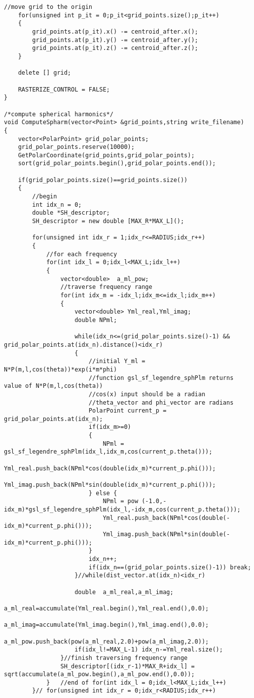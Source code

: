 \begin{enumerate}[1.]
\begin{lstlisting}[xleftmargin=0em]
	//move grid to the origin
	for(unsigned int p_it = 0;p_it<grid_points.size();p_it++)
	{
		grid_points.at(p_it).x() -= centroid_after.x();
		grid_points.at(p_it).y() -= centroid_after.y();
		grid_points.at(p_it).z() -= centroid_after.z();
	}

	delete [] grid;

	RASTERIZE_CONTROL = FALSE;
}

/*compute spherical harmonics*/
void ComputeSpharm(vector<Point> &grid_points,string write_filename)
{
	vector<PolarPoint> grid_polar_points;
	grid_polar_points.reserve(10000);
	GetPolarCoordinate(grid_points,grid_polar_points);
	sort(grid_polar_points.begin(),grid_polar_points.end());

	if(grid_polar_points.size()==grid_points.size())
	{
		//begin
		int idx_n = 0;
		double *SH_descriptor;
		SH_descriptor = new double [MAX_R*MAX_L]();

		for(unsigned int idx_r = 1;idx_r<=RADIUS;idx_r++)
		{
			//for each frequency
			for(int idx_l = 0;idx_l<MAX_L;idx_l++)
			{
				vector<double> 	a_ml_pow;
				//traverse frequency range
				for(int idx_m = -idx_l;idx_m<=idx_l;idx_m++)
				{
					vector<double> Yml_real,Yml_imag;
					double NPml;

					while(idx_n<=(grid_polar_points.size()-1) && grid_polar_points.at(idx_n).distance()<idx_r)
					{
						//initial Y_ml = N*P(m,l,cos(theta))*exp(i*m*phi)
						//function gsl_sf_legendre_sphPlm returns value of N*P(m,l,cos(theta))
						//cos(x) input should be a radian
						//theta_vector and phi_vector are radians
						PolarPoint current_p = grid_polar_points.at(idx_n);
						if(idx_m>=0)
						{
							NPml = gsl_sf_legendre_sphPlm(idx_l,idx_m,cos(current_p.theta()));
							Yml_real.push_back(NPml*cos(double(idx_m)*current_p.phi()));
							Yml_imag.push_back(NPml*sin(double(idx_m)*current_p.phi()));
						} else {
							NPml = pow (-1.0,-idx_m)*gsl_sf_legendre_sphPlm(idx_l,-idx_m,cos(current_p.theta()));
							Yml_real.push_back(NPml*cos(double(-idx_m)*current_p.phi()));
							Yml_imag.push_back(NPml*sin(double(-idx_m)*current_p.phi()));
						}
						idx_n++;
						if(idx_n==(grid_polar_points.size()-1)) break;
					}//while(dist_vector.at(idx_n)<idx_r)

					double 	a_ml_real,a_ml_imag;
					a_ml_real=accumulate(Yml_real.begin(),Yml_real.end(),0.0);
					a_ml_imag=accumulate(Yml_imag.begin(),Yml_imag.end(),0.0);
					a_ml_pow.push_back(pow(a_ml_real,2.0)+pow(a_ml_imag,2.0));
					if(idx_l!=MAX_L-1) idx_n-=Yml_real.size();
				}//finish traversing frequency range
				SH_descriptor[(idx_r-1)*MAX_R+idx_l] = sqrt(accumulate(a_ml_pow.begin(),a_ml_pow.end(),0.0));
			}	//end of for(int idx_l = 0;idx_l<MAX_L;idx_l++)
		}// for(unsigned int idx_r = 0;idx_r<RADIUS;idx_r++)


\end{lstlisting}
\end{enumerate}
